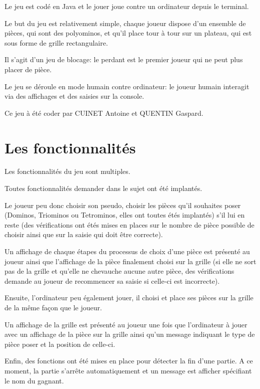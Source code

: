 \documentclass[a4paper, titlepage, french]{report}
\begin{document}
\bigskip

Le jeu est codé en Java et le jouer joue contre un ordinateur depuis le terminal.

\bigskip

Le but du jeu est relativement simple, chaque joueur dispose d'un ensemble de pièces, qui sont des polyominos, et qu'il place
tour à tour sur un plateau, qui est sous forme de grille rectangulaire. 

Il s'agit d'un jeu de blocage: le perdant est le premier
joueur qui ne peut plus placer de pièce.

Le jeu se déroule en mode
humain contre ordinateur: le joueur humain interagit via des affichages et des saisies sur la console.

\bigskip

Ce jeu à été coder par CUINET Antoine et QUENTIN Gaspard.



\newpage

\chapter{Les fonctionnalités}

Les fonctionnalités du jeu sont multiples.
\bigskip


Toutes fonctionnalités demander dans le sujet ont été implantés.
\bigskip

Le joueur peu donc choisir son pseudo, choisir les pièces qu'il souhaites poser (Dominos, Triominos ou Tetrominos, elles ont toutes étés implantés) s'il lui en reste (des vérifications ont étés mises en places sur le nombre de pièce possible de choisir ainsi que sur la saisie qui doit être correcte).

Un affichage de chaque étapes du processus de choix d'une pièce est présenté au joueur ainsi que l'affichage de la pièce finalement choisi sur la grille (si elle ne sort pas de la grille et qu'elle ne chevauche aucune autre pièce, des vérifications demande au joueur de recommencer sa saisie si celle-ci est incorrecte).
\bigskip

Ensuite, l'ordinateur peu également jouer, il choisi et place ses pièces sur la grille de la même façon que le joueur.

Un affichage de la grille est présenté au joueur une fois que l'ordinateur à jouer avec un affichage de la pièce sur la grille ainsi qu'un message indiquant le type de pièce poser et la position de celle-ci.
\bigskip

Enfin, des fonctions ont été mises en place pour détecter la fin d'une partie. A ce moment, la partie s'arrête automatiquement et un message est afficher spécifiant le nom du gagnant.
\end{document}
